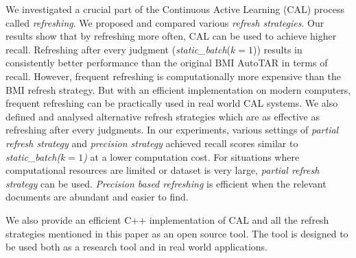 We investigated a crucial part of the Continuous Active Learning (CAL) process
called \textit{refreshing}. We proposed and compared various \textit{refresh
strategies}. Our results show that by refreshing more often, CAL can be used to
achieve higher recall. Refreshing after every judgment (\textit{static\_batch}($k
= 1$)) results in consistently better performance than the original BMI AutoTAR
in terms of recall. However, frequent refreshing is computationally more
expensive than the BMI refresh
strategy. But with an efficient implementation on modern computers, frequent
refreshing can be practically used in real world CAL systems.  We also defined and
analysed alternative refresh strategies which are as effective as refreshing
after every judgments. In our experiments, various settings of \textit{partial refresh
strategy} and \textit{precision strategy} achieved recall scores similar to
\textit{static\_batch($k = 1$)} at a lower computation cost. For situations
where computational resources are limited or dataset is very large,
\textit{partial refresh strategy} can be used. \textit{Precision based
refreshing} is efficient when the relevant documents are abundant and easier to
find.

We also provide an efficient C++ implementation of CAL and all the refresh
strategies mentioned in this paper as an open source tool. The tool is designed
to be used both as a research tool and in real world applications.

